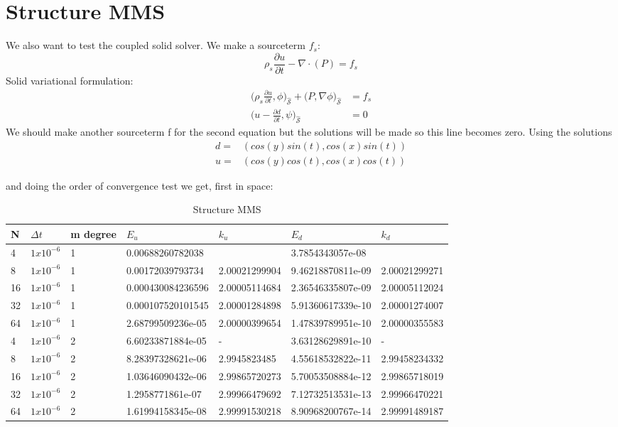 \section{Structure MMS}
We also want to test the coupled solid solver. We make a sourceterm $f_s$:
$$\rho_s \frac{\partial u}{\partial t} - \nabla \cdot ( P ) = f_s $$
Solid variational formulation:
\begin{align}
\big(\rho_s \frac{\partial u}{\partial t},\phi \big)_{\mathcal{\hat{S}}} + \big(P, \nabla \phi \big)_{\mathcal{\hat{S}}} &=f_s \\
\big( u- \frac{\partial d}{\partial t} ,\psi \big)_{\mathcal{\hat{S}}} &= 0 
\end{align}
We should make another sourceterm f for the second equation but the solutions will be made so this line becomes zero.
Using the solutions 
\begin{align*}
d =& ( cos(y)sin(t) , cos(x)sin(t) )\\
u =& ( cos(y)cos(t), cos(x)cos(t) )
\end{align*}



and doing the order of convergence test we get, first in space:

\begin{table}[h!]
\centering
\caption{Structure MMS}
\label{my-label}
\begin{tabular}{|l|l|l|l|l|l|l|}
\hline
N & $\Delta t$ & m degree & $E_u$ & $k_u$ & $E_d$ & $k_d$ \\ \hline
4 & $1x10^{-6}$ & 1 & 0.00688260782038 &  & 3.7854343057e-08 &  \\ \hline
8 & $1x10^{-6}$ & 1 & 0.00172039793734 & 2.00021299904 & 9.46218870811e-09 & 2.00021299271 \\ \hline
16 & $1x10^{-6}$ & 1 & 0.000430084236596 & 2.00005114684 & 2.36546335807e-09 & 2.00005112024 \\ \hline
32 & $1x10^{-6}$ & 1 & 0.000107520101545 & 2.00001284898 & 5.91360617339e-10 & 2.00001274007 \\ \hline
64 & $1x10^{-6}$ & 1 & 2.68799509236e-05 & 2.00000399654 & 1.47839789951e-10 & 2.00000355583 \\ \hline
4 & $1x10^{-6}$ & 2 & 6.60233871884e-05 & - & 3.63128629891e-10 & - \\ \hline
8 & $1x10^{-6}$ & 2 & 8.28397328621e-06 & 2.9945823485 & 4.55618532822e-11 & 2.99458234332 \\ \hline
16 & $1x10^{-6}$ & 2 & 1.03646090432e-06 & 2.99865720273 & 5.70053508884e-12 & 2.99865718019 \\ \hline
32 & $1x10^{-6}$ & 2 & 1.2958771861e-07 & 2.99966479692 & 7.12732513531e-13 & 2.99966470221 \\ \hline
64 & $1x10^{-6}$ & 2 & 1.61994158345e-08 & 2.99991530218 & 8.90968200767e-14 & 2.99991489187 \\ \hline
\end{tabular}
\end{table}

